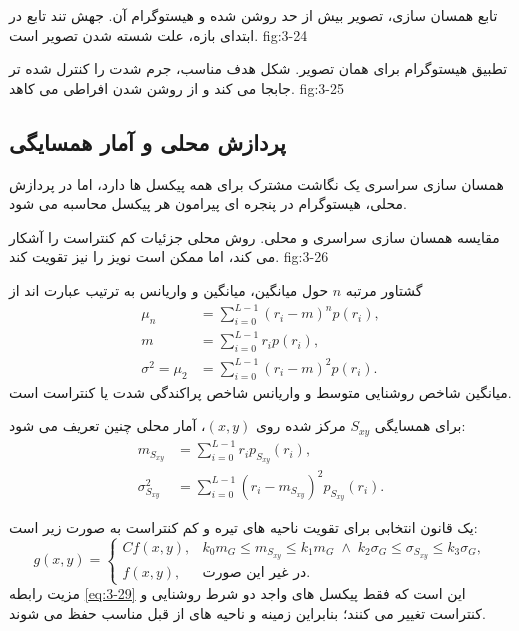 {تابع همسان سازی، تصویر بیش از حد روشن شده و هیستوگرام آن. جهش تند تابع در
ابتدای بازه، علت شسته شدن تصویر است.}
{fig:3-24}

{تطبیق هیستوگرام برای همان تصویر. شکل هدف مناسب، جرم شدت را کنترل شده تر
جابجا می کند و از روشن شدن افراطی می کاهد.}
{fig:3-25}

\subsection{پردازش محلی و آمار همسایگی}

همسان سازی سراسری یک نگاشت مشترک برای همه پیکسل ها دارد، اما در پردازش
محلی، هیستوگرام در پنجره ای پیرامون هر پیکسل محاسبه می شود.

{مقایسه همسان سازی سراسری و محلی. روش محلی جزئیات کم کنتراست را آشکار می کند،
اما ممکن است نویز را نیز تقویت کند.}
{fig:3-26}

گشتاور مرتبه \(n\) حول میانگین، میانگین و واریانس به ترتیب عبارت اند از
\begin{align}
  \mu_n&=\sum_{i=0}^{L-1}(r_i-m)^n p(r_i),
  \tag{3-24}\label{eq:3-24}\\
  m&=\sum_{i=0}^{L-1}r_i p(r_i),
  \tag{3-25}\label{eq:3-25}\\
  \sigma^2=\mu_2&=\sum_{i=0}^{L-1}(r_i-m)^2p(r_i).
  \tag{3-26}\label{eq:3-26}
\end{align}
میانگین شاخص روشنایی متوسط و واریانس شاخص پراکندگی شدت یا کنتراست است.

برای همسایگی \(S_{xy}\) مرکز شده روی \((x,y)\)، آمار محلی چنین تعریف می شود:
\begin{align}
  m_{S_{xy}}&=\sum_{i=0}^{L-1}r_i p_{S_{xy}}(r_i),
  \tag{3-27}\label{eq:3-27}\\
  \sigma^2_{S_{xy}}&=\sum_{i=0}^{L-1}(r_i-m_{S_{xy}})^2p_{S_{xy}}(r_i).
  \tag{3-28}\label{eq:3-28}
\end{align}

یک قانون انتخابی برای تقویت ناحیه های تیره و کم کنتراست به صورت زیر است:
\begin{equation}
g(x,y)=
\begin{cases}
C f(x,y), & k_0m_G\le m_{S_{xy}}\le k_1m_G
\;\land\; k_2\sigma_G\le\sigma_{S_{xy}}\le k_3\sigma_G,\\
f(x,y), & \text{در غیر این صورت.}
\end{cases}
\tag{3-29}\label{eq:3-29}
\end{equation}
مزیت رابطه \eqref{eq:3-29} این است که فقط پیکسل های واجد دو شرط روشنایی و
کنتراست تغییر می کنند؛ بنابراین زمینه و ناحیه های از قبل مناسب حفظ می شوند.

